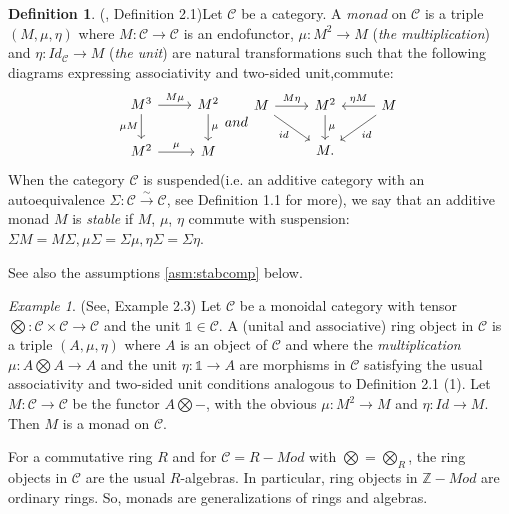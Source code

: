 \documentclass{article}
\newcommand{\cC}{\mathcal{C}}
\theoremstyle{definition}
\newtheorem{definition}[theorem]{Definition}
\theoremstyle{remark}
\newtheorem{example}[theorem]{Example}
\begin{document}
\begin{definition}(\cite{balmer:septrcat}, Definition 2.1)\label{def:monad}  Let $\cC$ be a category. A \textit{monad} on $\cC$ is a triple $(M,\mu,\eta)$ where $M: \cC \rightarrow \cC$ is an endofunctor, $\mu:M^{2} \rightarrow M$ (\textit{the multiplication}) and $\eta:Id_{\cC} \rightarrow M$ (\textit{the unit}) are natural transformations such that the following diagrams expressing associativity and two-sided unit,commute:
\begin{equation}
    \begin{tikzcd}
      M^{3} \arrow{r}{M\mu} \arrow[swap]{d}{\mu M} & M^{2} \arrow{d}{\mu} \\
      M^{2} \arrow{r}{\mu} & M
      \end{tikzcd}
     and 
     \begin{tikzcd}
      M \arrow{r}{M\eta} \arrow[swap]{dr}{id} & M^{2} \arrow{d}{\mu} & M \arrow[swap]{l}{\eta M} \arrow{dl}{id} \\
       &M .
     \end{tikzcd}
\end{equation}
When the category $\cC$ is suspended(i.e. an additive category with an autoequivalence $\Sigma:\cC \xrightarrow{\sim}\cC$, see \cite{balmer:septrcat}  Definition 1.1 for more), we say that an additive monad $M$ is \textit{stable} if $M$, $\mu$, $\eta$ commute with suspension: $\Sigma M=M \Sigma , \mu \Sigma=\Sigma \mu , \eta\Sigma=\Sigma\eta.$
\end{definition}
See also the assumptions \ref{asm:stabcomp} below.%
\begin{example}
    (See, \cite{balmer:septrcat} Example 2.3) Let $\cC$ be a monoidal category with tensor $\bigotimes: \cC \times \cC \rightarrow \cC$ and the unit $\mathbb{1}  \in \cC$. A (unital and associative) ring object in $\cC$ is a triple $(A,\mu,\eta)$ where $A$ is an object of $\cC$ and where the \textit{multiplication} $\mu: A \bigotimes A \rightarrow A$ and the unit $\eta: \mathbb{1} \rightarrow A$ are morphisms in $\cC$ satisfying the usual associativity and two-sided unit conditions analogous to Definition 2.1 (1). Let $M:\cC \rightarrow \cC$ be the functor $A \bigotimes-$, with the obvious $\mu: M^{2} \rightarrow M$ and $\eta:Id \rightarrow M.$ Then $M$ is a monad on $\cC$.

\end{example}
For a commutative ring $R$ and for $\cC=R-Mod$ with $\bigotimes=\bigotimes_{R}$, the ring objects in $\cC$ are the usual $R$-algebras. In particular, ring objects in $\mathbb{Z}-Mod$ are ordinary rings. So, monads are generalizations of rings and algebras.
\end{document}

